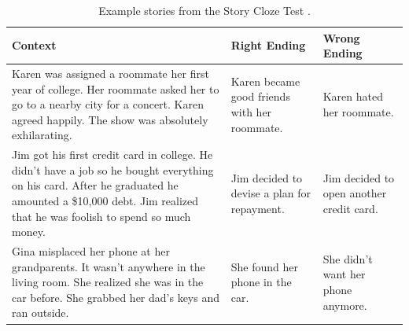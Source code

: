 \begin{table}[h!]
\small
\centering
\begin{tabular}{p{}p{}p{}}
\toprule
    \textbf{Context} & \textbf{Right Ending} & \textbf{Wrong Ending} \\
\midrule
    Karen was assigned a roommate her first year of college. Her roommate asked her to go to a nearby city for a concert. Karen agreed happily. The show was absolutely exhilarating. & Karen became good friends with her roommate. & Karen hated her roommate. \\
\midrule
    Jim got his first credit card in college. He didn’t have a job so he bought everything on his card. After he graduated he amounted a \$10,000 debt. Jim realized that he was foolish to spend so much money. & Jim decided to devise a plan for repayment. & Jim decided to open another credit card. \\
\midrule
    Gina misplaced her phone at her grandparents. It wasn’t anywhere in the living room. She realized she was in the car before. She grabbed her dad’s keys and ran outside. & She found her phone in the car. & She didn’t want her phone anymore. \\
\bottomrule
\end{tabular}
\caption{Example stories from the Story Cloze Test \citep{mostafazadeh2016corpus}.}
\label{tab:story_cloze_test}
\end{table}

